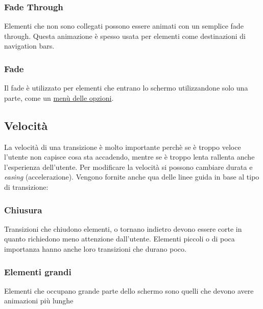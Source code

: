 \documentclass[12pt, a4paper]{report}
\begin{document}
		\subsubsection{Fade Through}
			Elementi che non sono collegati possono essere animati con un semplice fade through. Questa animazione è spesso usata per elementi come destinazioni di navigation bars.
		\subsubsection{Fade}
			Il fade è utilizzato per elementi che entrano lo schermo utilizzandone solo una parte, come un \href{https://kstatic.googleusercontent.com/files/4bf2ddbf50d779f37d88f276b831fad1aad78a23379a87d2b715dbb90d878897d1ad5edcf03385e1814d2ec3f4e9f152fd736ab2727d7f0e0d8b58467eb41057}{menù delle opzioni}.
	\subsection{Velocità}
		La velocità di una transizione è molto importante perchè se è troppo veloce l'utente non capisce cosa sta accadendo, mentre se è troppo lenta rallenta anche l'esperienza dell'utente.
		Per modificare la velocità si possono cambiare durata e \textit{easing} (accelerazione). Vengono fornite anche qua delle linee guida in base al tipo di transizione:
		\subsubsection{Chiusura}
		Transizioni che chiudono elementi, o tornano indietro devono essere corte in quanto richiedono meno attenzione dall'utente.
		Elementi piccoli o di poca importanza hanno anche loro transizioni che durano poco.
		\subsubsection{Elementi grandi}
		Elementi che occupano grande parte dello schermo sono quelli che devono avere animazioni più lunghe
\end{document}
